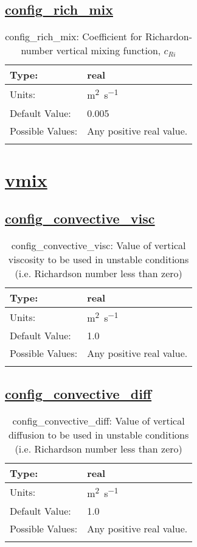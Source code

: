 \subsection[config\_rich\_mix]{\hyperref[sec:nm_tab_vmix_rich]{config\_rich\_mix}}
\label{subsec:nm_sec_config_rich_mix}
\begin{center}
\begin{longtable}{| p{2.0in} || p{4.0in} |}
    \hline
    Type: & real \\
    \hline
    Units: & \si{m^2.s^{-1}} \\
    \hline
    Default Value: & 0.005 \\
    \hline
    Possible Values: & Any positive real value. \\
    \hline
    \caption{config\_rich\_mix: Coefficient for Richardon-number vertical mixing function, $c_{Ri}$}
\end{longtable}
\end{center}
\section[vmix]{\hyperref[sec:nm_tab_vmix]{vmix}}
\label{sec:nm_sec_vmix}
\subsection[config\_convective\_visc]{\hyperref[sec:nm_tab_vmix]{config\_convective\_visc}}
\label{subsec:nm_sec_config_convective_visc}
\begin{center}
\begin{longtable}{| p{2.0in} || p{4.0in} |}
    \hline
    Type: & real \\
    \hline
    Units: & \si{m^2.s^{-1}} \\
    \hline
    Default Value: & 1.0 \\
    \hline
    Possible Values: & Any positive real value. \\
    \hline
    \caption{config\_convective\_visc: Value of vertical viscosity to be used in unstable conditions (i.e. Richardson number less than zero)}
\end{longtable}
\end{center}
\subsection[config\_convective\_diff]{\hyperref[sec:nm_tab_vmix]{config\_convective\_diff}}
\label{subsec:nm_sec_config_convective_diff}
\begin{center}
\begin{longtable}{| p{2.0in} || p{4.0in} |}
    \hline
    Type: & real \\
    \hline
    Units: & \si{m^2.s^{-1}} \\
    \hline
    Default Value: & 1.0 \\
    \hline
    Possible Values: & Any positive real value. \\
    \hline
    \caption{config\_convective\_diff: Value of vertical diffusion to be used in unstable conditions (i.e. Richardson number less than zero)}
\end{longtable}
\end{center}
